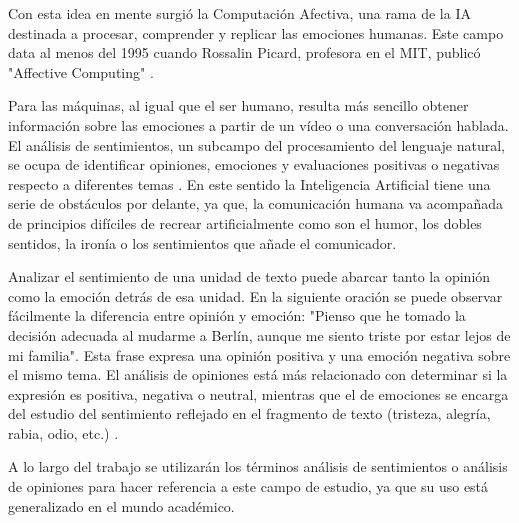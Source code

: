 Con esta idea en mente surgió la Computación Afectiva, una rama de la IA destinada a procesar, comprender y replicar las emociones humanas. Este campo data al menos del 1995 cuando Rossalin Picard, profesora en el MIT, publicó "Affective Computing" \cite{picard1995}.


Para las máquinas, al igual que el ser humano, resulta más sencillo obtener información sobre las emociones a partir de un vídeo o una conversación hablada. El análisis de sentimientos, un subcampo del procesamiento del lenguaje natural, se ocupa de identificar opiniones, emociones y evaluaciones positivas o negativas respecto a diferentes temas \cite{polarity}. En este sentido la Inteligencia Artificial tiene una serie de obstáculos por delante, ya que, la comunicación humana va acompañada de principios difíciles de recrear artificialmente como son el humor, los dobles sentidos, la ironía o los sentimientos que añade el comunicador.

Analizar el sentimiento de una unidad de texto puede abarcar tanto la opinión como la emoción detrás de esa unidad. En la siguiente oración se puede observar fácilmente la diferencia entre opinión y emoción: "Pienso que he tomado la decisión adecuada al mudarme a Berlín, aunque me siento triste por estar lejos de mi familia". Esta frase expresa una opinión positiva y una emoción negativa sobre el mismo tema. El análisis de opiniones está más relacionado con determinar si la expresión es positiva, negativa o neutral, mientras que el de emociones se encarga del estudio del sentimiento reflejado en el fragmento de texto (tristeza, alegría, rabia, odio, etc.) \cite{curentStateSentiment}. 

A lo largo del trabajo se utilizarán los términos análisis de sentimientos o análisis de opiniones para hacer referencia a este campo de estudio, ya que su uso está generalizado en el mundo académico.

